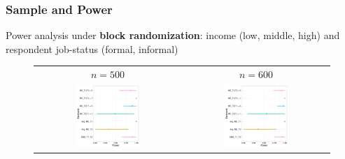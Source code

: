 \documentclass{beamer}\usepackage[]{graphicx}\usepackage[]{color}
\begin{document}
\begin{frame}\frametitle{Sample and Power}
Power analysis under \textbf{block randomization}: income (low, middle, high) and respondent job-status (formal, informal) 
    
\begin{figure}[htbp]
	\centering
\begin{table}
	\begin{tabular}{cc}
	$n=500$	& $n=600$  \\
	\includegraphics[width=0.45\textwidth]{power500_bra}	& \includegraphics[width=0.45\textwidth]{power600_bra}  \\
	\end{tabular}
\end{table}
\end{figure}
    
\end{frame}
\end{document}
